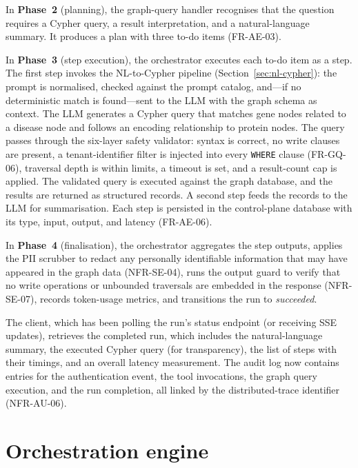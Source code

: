 \documentclass[a4paper,noexaminfo]{sapthesis}
\begin{document}
In \textbf{Phase~2} (planning), the graph-query handler recognises that
the question requires a Cypher query, a result interpretation, and a
natural-language summary.  It produces a plan with three to-do items
(FR-AE-03).

In \textbf{Phase~3} (step execution), the orchestrator executes each to-do
item as a step.  The first step invokes the NL-to-Cypher pipeline
(Section~\ref{sec:nl-cypher}): the prompt is normalised, checked against
the prompt catalog, and---if no deterministic match is found---sent to the
LLM with the graph schema as context.  The LLM generates a Cypher query
that matches gene nodes related to a disease node and follows an encoding
relationship to protein nodes.  The query passes through the six-layer
safety validator: syntax is correct, no write clauses are present,
a tenant-identifier filter is injected into every \texttt{WHERE} clause
(FR-GQ-06), traversal depth is within limits, a timeout is set, and a
result-count cap is applied.  The validated query is executed against the
graph database, and the results are returned as structured records.  A
second step feeds the records to the LLM for summarisation.  Each step is
persisted in the control-plane database with its type, input, output, and
latency (FR-AE-06).

In \textbf{Phase~4} (finalisation), the orchestrator aggregates the step
outputs, applies the PII scrubber to redact any personally identifiable
information that may have appeared in the graph data (NFR-SE-04), runs
the output guard to verify that no write operations or unbounded traversals
are embedded in the response (NFR-SE-07), records token-usage metrics, and
transitions the run to \emph{succeeded}.

The client, which has been polling the run's status endpoint (or receiving
SSE updates), retrieves the completed run, which includes the
natural-language summary, the executed Cypher query (for transparency),
the list of steps with their timings, and an overall latency measurement.
The audit log now contains entries for the authentication event, the tool
invocations, the graph query execution, and the run completion, all linked
by the distributed-trace identifier (NFR-AU-06).


\section{Orchestration engine}
\label{sec:orchestration-engine}
\end{document}
